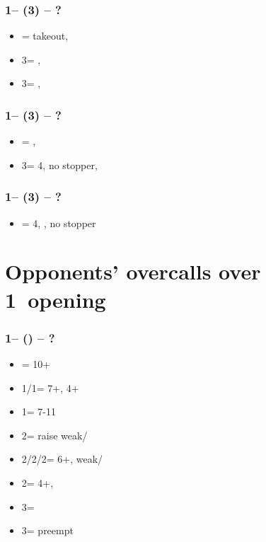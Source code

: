 \documentclass[12pt, a4paper]{report}
\begin{document}
{{{            \subsubsection*{1\clubs -- (3\diams) -- ?}
            \begin{itemize}
                \item \dbl = takeout, \gf
                \item 3\hearts = \trsf{\spades}, \invp
                \item 3\spades = \trsf{\hearts}, \gf
            \end{itemize}

            \subsubsection*{1\clubs -- (3\hearts) -- ?}
            \begin{itemize}
                \item \dbl = \spades, \invp
                \item 3\spades = 4\spades, no \hearts stopper, \gf
            \end{itemize}

            \subsubsection*{1\clubs -- (3\spades) -- ?}
            \begin{itemize}
                \item \dbl = 4\hearts, \gf, no \spades stopper
            \end{itemize}

        }

        \section*{\colorbox{blue!30}{Opponents' overcalls over 1\diams\ opening}}
         {

            \subsubsection*{1\diams -- (\dbl) -- ?}
            \begin{itemize}
                \item \rdbl = 10+
                \item 1\hearts/1\spades = 7+\hcp, 4+
                \item 1\nt = 7-11
                \item 2\clubs = \diams raise weak/\gf
                \item 2\diams/2\hearts/2\spades = \trsf{\hearts/\spades/\clubs} 6+, weak/\gf
                \item 2\nt = 4+\diams, \invp
                \item 3\clubs = \inv
                \item 3\diams = preempt
            \end{itemize}

}}}
\end{document}
